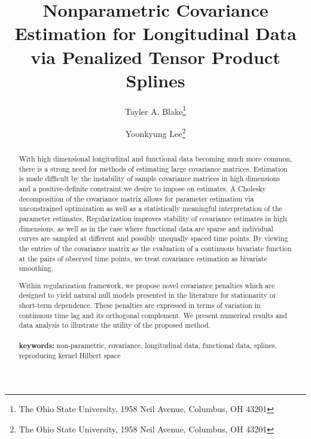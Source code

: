 \documentclass[12pt]{article}
\theoremstyle{definition}
\def\bL{\mathbf{L}}
\begin{document}
\def\bL{\mathbf{L}}



\title{ Nonparametric Covariance Estimation for Longitudinal Data via Penalized Tensor Product Splines}

\author{Tayler A. Blake\thanks{The Ohio State University, 1958 Neil Avenue, Columbus, OH 43201} \and  Yoonkyung Lee\thanks{The Ohio State University, 1958 Neil Avenue, Columbus, OH 43201}}


\maketitle

\begin{abstract}
With high dimensional longitudinal and functional data becoming much more common, there is a strong need for methods of estimating large covariance matrices. Estimation is made difficult  by the instability of sample covariance matrices in high dimensions and a positive-definite constraint we desire to impose on estimates. A Cholesky decomposition of the covariance matrix allows for parameter estimation via unconstrained optimization as well as a statistically meaningful interpretation of the parameter estimates. Regularization improves stability of covariance estimates in high dimensions, as well as in the case where functional data are sparse and individual curves are sampled at different and possibly unequally spaced time points. By viewing the entries of the covariance matrix as the evaluation of a continuous bivariate function at the pairs of observed time points, we treat covariance estimation as bivariate smoothing. 

Within regularization framework, we propose novel covariance penalties which are designed to yield natural null models presented in the literature for stationarity or short-term dependence. These penalties are expressed in terms of variation in continuous time lag and its orthogonal complement. We present numerical results and data analysis to illustrate the utility of the proposed method. \\
\\
{\bf keywords:} non-parametric, covariance, longitudinal data, functional data, splines, reproducing kernel Hilbert space
\end{abstract}
\end{document}

